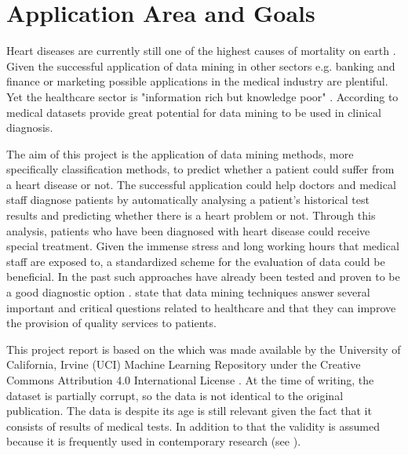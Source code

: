 \section{Application Area and Goals} \label{sec:applicationAreaGoals}

Heart diseases are currently still one of the highest causes of mortality on earth \citep{nahar2013, kavitha2016, statistischesbundesamt2020}.
Given the successful application of data mining in other sectors e.g. banking and finance or marketing \citep{keles2017} possible applications in the medical industry are plentiful. Yet the healthcare sector is "information rich but knowledge poor" \citep{soni2011}. According to \citet{soni2011} medical datasets provide great potential for data mining to be used in clinical diagnosis.


The aim of this project is the application of data mining methods, more specifically classification methods, to predict whether a patient could suffer from a heart disease or not. The successful application could help doctors and medical staff diagnose patients by automatically analysing a patient's historical test results and predicting whether there is a heart problem or not. Through this analysis, patients who have been diagnosed with heart disease could receive special treatment. Given the immense stress and long working hours that medical staff are exposed to, a standardized scheme for the evaluation of data could be beneficial. 
In the past such approaches have already been tested and proven to be a good diagnostic option \citep{usharani2011}. \citet{jabbar2013} state that data mining techniques answer several important and critical questions related to healthcare and that they can improve the provision of quality services to patients.

This project report is based on the  \citep{janosi1988} which was made available by the University of California, Irvine (UCI) Machine Learning Repository under the Creative Commons Attribution 4.0 International License \citep{janosi1988}. At the time of writing, the dataset is partially corrupt, so the data is not identical to the original publication. The data is despite its age is still relevant given the fact that it consists of results of medical tests. In addition to that the validity is assumed because it is frequently used in contemporary research (see \cite{usharani2011, aha1988, nahar2013}). 